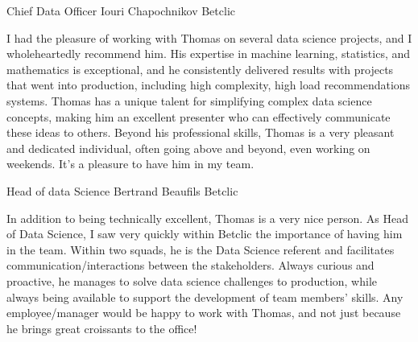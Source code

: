 

\begin{cventries}


\cventry
    {Chief Data Officer} %
    {Iouri Chapochnikov} %
    {Betclic} %
    {} %
    {
    \begin{cvitems}
    I had the pleasure of working with Thomas on several data science projects, and I wholeheartedly recommend him. His expertise in machine learning, statistics, and mathematics is exceptional, and he consistently delivered results with projects that went into production, including high complexity, high load recommendations systems. Thomas has a unique talent for simplifying complex data science concepts, making him an excellent presenter who can effectively communicate these ideas to others. Beyond his professional skills, Thomas is a very pleasant and dedicated individual, often going above and beyond, even working on weekends. It's a pleasure to have him in my team.
\end{cvitems}
    }
    

  \cventry
    {Head of data Science} %
    {Bertrand Beaufils} %
    {Betclic} %
    {} %
    {
    \begin{cvitems}
    In addition to being technically excellent, Thomas is a very nice person.
    As Head of Data Science, I saw very quickly within Betclic the importance of having him in the team.
    Within two squads, he is the Data Science referent and facilitates communication/interactions between the stakeholders.
    Always curious and proactive, he manages to solve data science challenges to production, while always being available to support the development of team members' skills.
    Any employee/manager would be happy to work with Thomas, and not just because he brings great croissants to the office!
    \end{cvitems}
    }



\end{cventries}

